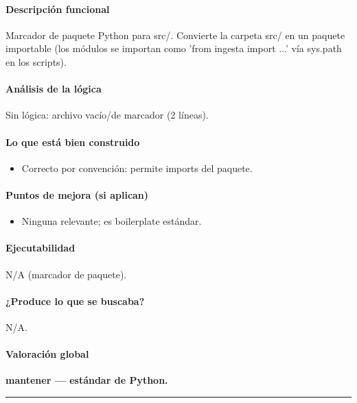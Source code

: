 \paragraph{Descripción funcional}
Marcador de paquete Python para src/. Convierte la carpeta src/ en un paquete importable (los módulos se importan como 'from ingesta import ...' vía sys.path en los scripts).

\paragraph{Análisis de la lógica}
Sin lógica: archivo vacío/de marcador (2 líneas).

\paragraph{Lo que está bien construido}
\begin{itemize}
  \item Correcto por convención: permite imports del paquete.
\end{itemize}

\paragraph{Puntos de mejora (si aplican)}
\begin{itemize}
  \item Ninguna relevante; es boilerplate estándar.
\end{itemize}

\paragraph{Ejecutabilidad}
N/A (marcador de paquete).

\paragraph{¿Produce lo que se buscaba?}
N/A.

\paragraph{Valoración global}
\textbf{mantener --- estándar de Python.}

\medskip
\hrule
